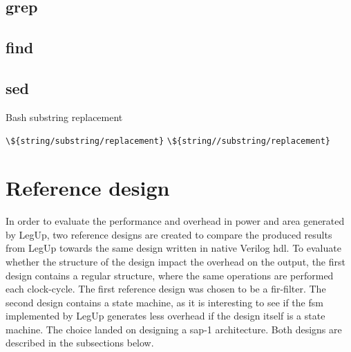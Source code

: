 \subsection{grep}
\subsection{find}
\subsection{sed}
Bash substring replacement

\verb!\${string/substring/replacement}!
\verb!\${string//substring/replacement}!



\section{Reference design}
\label{sec:refdes}
In order to evaluate the performance and overhead in power and area generated by LegUp, two reference designs are created to compare the produced results from LegUp towards the same design written in native Verilog \gls{hdl}. To evaluate whether the structure of the design impact the overhead on the output, the first design contains a regular structure, where the same operations are performed each clock-cycle. The first reference design was chosen to be a \gls{fir}-filter. The second design contains a state machine, as it is interesting to see if the \gls{fsm} implemented by LegUp generates less overhead if the design itself is a state machine. The choice landed on designing a \gls{sap-1} architecture. Both designs are described in the subsections below.

